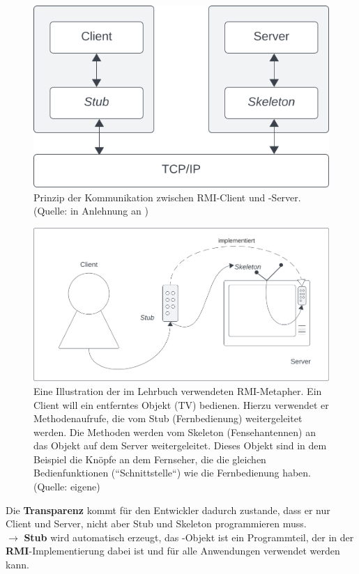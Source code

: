 \begin{figure}
    \centering
    \includegraphics[scale=0.4]{chapters/fopt5/img/rmi/stubskeleton}
    \caption{Prinzip der Kommunikation zwischen RMI-Client und -Server. (Quelle: in Anlehnung an \cite[312, Bild 6.3]{Oec22})}
    \label{fig:stubskeleton}
\end{figure}


\begin{figure}
    \centering
    \includegraphics[scale=0.35]{chapters/fopt5/img/rmi/tv}
    \caption{Eine Illustration der im Lehrbuch verwendeten RMI-Metapher. Ein Client will ein entferntes Objekt (TV) bedienen. Hierzu verwendet er Methodenaufrufe, die vom Stub (Fernbedienung) weitergeleitet werden. Die Methoden werden vom Skeleton (Fensehantennen) an das Objekt auf dem Server weitergeleitet. Dieses Objekt sind in dem Beispiel die Knöpfe an dem Fernseher, die die gleichen Bedienfunktionen (``Schnittstelle``) wie die Fernbedienung haben. (Quelle: eigene)}
    \label{fig:tv}
\end{figure}

\noindent
Die \textbf{Transparenz} kommt für den Entwickler dadurch zustande, dass er nur Client und Server, nicht aber Stub und Skeleton programmieren muss.\\
$\rightarrow$ \textbf{Stub} wird automatisch erzeugt, das -Objekt ist ein Programmteil, der in der \textbf{RMI}-Implementierung dabei ist und für alle Anwendungen verwendet werden kann.\\


